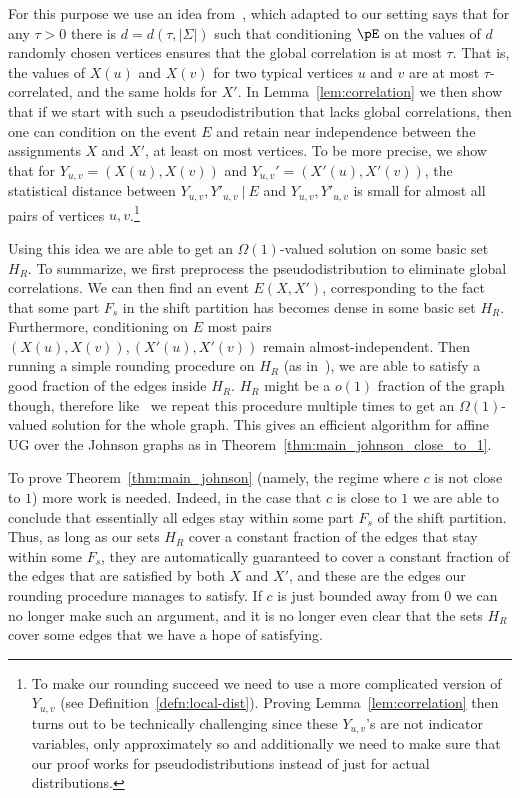 For this purpose we use an idea from~\cite{RT12}, which adapted to our setting says 
that for any $\tau>0$ there is $d = d(\tau,|\Sigma|)$ such that conditioning $\pE$ on the values of $d$ randomly chosen vertices ensures that the global correlation is 
at most $\tau$. That is, the values of $X(u)$ and $X(v)$
for two typical vertices $u$ and $v$ are at most $\tau$-correlated, and the same holds for $X'$. 
In Lemma~\ref{lem:correlation} we then show that if we start with such a pseudodistribution that lacks global correlations, then one can condition on the event $E$ and retain near independence between the assignments $X$ and $X'$, at least on most vertices. To be more precise, we show that for $Y_{u,v} = (X(u), X(v))$ and $Y_{u,v}' = (X'(u), X'(v))$, the statistical distance between $Y_{u,v}, Y'_{u,v}~|~E$ 
and $Y_{u,v}, Y'_{u,v}$ is small for almost all pairs of vertices $u,v$.\footnote{To make our rounding succeed we need to use a more complicated version of $Y_{u,v}$ (see Definition~\ref{defn:local-dist}). Proving Lemma~\ref{lem:correlation} then turns out to be  technically challenging since these $Y_{u,v}$'s are not indicator variables, only approximately so and additionally we need to make sure that our proof works for pseudodistributions instead of just for actual distributions.}

Using this idea we are able to get an $\Omega(1)$-valued solution on some basic set $H_R$. To summarize, we first preprocess the pseudodistribution to eliminate global correlations. We can then find an event $E(X,X')$, corresponding to the 
fact that some part $F_s$ in the shift partition has becomes dense in some basic set $H_R$. Furthermore, conditioning on $E$ most pairs $(X(u),X(v)), (X'(u),X'(v))$ remain almost-independent. Then running a simple rounding procedure on $H_R$ (as in~\cite{BBKSS}), we are able to satisfy a good fraction of the edges inside $H_R$. $H_R$ might be a $o(1)$ fraction of the graph though, therefore like~\cite{BBKSS} we repeat this procedure multiple times to get an $\Omega(1)$-valued solution for the whole graph. This gives an efficient algorithm for affine UG over the Johnson graphs as in Theorem~\ref{thm:main_johnson_close_to_1}.

To prove Theorem~\ref{thm:main_johnson}
(namely, the regime where $c$ is not close to $1$) more work is needed. Indeed, in the case that $c$ is 
close to 
$1$ we are able to conclude that essentially all edges 
stay within some part $F_s$ of the shift partition. Thus, 
as long as our sets $H_R$ cover a constant fraction of 
the edges that stay within some $F_s$, they are automatically guaranteed to cover a constant fraction of the edges that 
are satisfied by both $X$ and $X'$, and these are the edges our rounding procedure manages to satisfy. If $c$ is just 
bounded away from $0$ we can no longer make such an argument, 
and it is no longer even clear that the sets 
$H_R$ cover some edges that we have a hope of satisfying.


